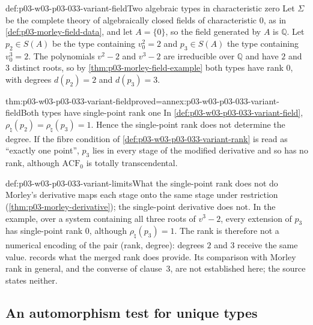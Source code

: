 \begin{hbexample}{def:p03-w03-p03-033-variant-field}{Two algebraic types in characteristic zero}
Let \(\Sigma\) be the complete theory of algebraically closed fields of
characteristic \(0\), as in \cref{def:p03-morley-field-data}, and let
\(A=\{0\}\), so the field generated by \(A\) is \(\mathbb Q\). Let
\(p_2\in S(A)\) be the type containing \(v_0^2=2\) and \(p_3\in S(A)\)
the type containing \(v_0^3=2\). The polynomials \(v^2-2\) and
\(v^3-2\) are irreducible over \(\mathbb Q\) and have \(2\) and \(3\)
distinct roots, so by \cref{thm:p03-morley-field-example} both types have
rank \(0\), with degrees \(d(p_2)=2\) and \(d(p_3)=3\).
\end{hbexample}

\begin{hbtheorem}{thm:p03-w03-p03-033-variant-field}{proved=annex:p03-w03-p03-033-variant-field}{Both types have single-point rank one}
In \cref{def:p03-w03-p03-033-variant-field},
\(\rho_\natural(p_2)=\rho_\natural(p_3)=1\). Hence the single-point rank
does not determine the degree. If the fibre condition of
\cref{def:p03-w03-p03-033-variant-rank} is read as ``exactly one point'',
\(p_3\) lies in every stage of the modified derivative and so has no rank,
although \(\mathrm{ACF}_0\) is totally transcendental.
\end{hbtheorem}

\begin{hbwarning}{def:p03-w03-p03-033-variant-limits}{What the single-point rank does not do}
Morley's derivative maps each stage onto the same stage under restriction
(\cref{thm:p03-morley-derivative}); the single-point derivative does not.
In the example, over a system containing all three roots of \(v^3-2\),
every extension of \(p_3\) has single-point rank \(0\), although
\(\rho_\natural(p_3)=1\). The rank is therefore not a numerical encoding of
the pair (rank, degree): degrees \(2\) and \(3\) receive the same value.
 records what the merged rank
does provide. Its comparison with Morley rank in general, and the converse
of clause~3, are not established here; the source states neither.
\end{hbwarning}

\subsection{An automorphism test for unique types}
\label{sec:p03-w03-p03-033-automorphism-test}

